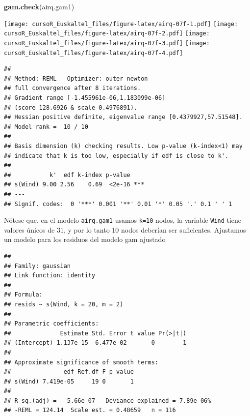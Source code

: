 \documentclass[]{book}
\newenvironment{Shaded}{\begin{snugshade}}{\end{snugshade}}
\newcommand{\KeywordTok}[1]{\textcolor[rgb]{0.13,0.29,0.53}{\textbf{#1}}}
\newcommand{\DataTypeTok}[1]{\textcolor[rgb]{0.13,0.29,0.53}{#1}}
\newcommand{\DecValTok}[1]{\textcolor[rgb]{0.00,0.00,0.81}{#1}}
\newcommand{\StringTok}[1]{\textcolor[rgb]{0.31,0.60,0.02}{#1}}
\newcommand{\OtherTok}[1]{\textcolor[rgb]{0.56,0.35,0.01}{#1}}
\newcommand{\OperatorTok}[1]{\textcolor[rgb]{0.81,0.36,0.00}{\textbf{#1}}}
\newcommand{\NormalTok}[1]{#1}
\begin{document}
\begin{Shaded}
\begin{Highlighting}[]
\KeywordTok{gam.check}\NormalTok{(airq.gam1)}
\end{Highlighting}
\end{Shaded}

\texttt{[image: cursoR\_Euskaltel\_files/figure-latex/airq-07f-1.pdf]}
\texttt{[image: cursoR\_Euskaltel\_files/figure-latex/airq-07f-2.pdf]}
\texttt{[image: cursoR\_Euskaltel\_files/figure-latex/airq-07f-3.pdf]}
\texttt{[image: cursoR\_Euskaltel\_files/figure-latex/airq-07f-4.pdf]}

\begin{verbatim}
## 
## Method: REML   Optimizer: outer newton
## full convergence after 8 iterations.
## Gradient range [-1.455961e-06,1.183099e-06]
## (score 128.6926 & scale 0.4976891).
## Hessian positive definite, eigenvalue range [0.4379927,57.51548].
## Model rank =  10 / 10 
## 
## Basis dimension (k) checking results. Low p-value (k-index<1) may
## indicate that k is too low, especially if edf is close to k'.
## 
##           k'  edf k-index p-value    
## s(Wind) 9.00 2.56    0.69  <2e-16 ***
## ---
## Signif. codes:  0 '***' 0.001 '**' 0.01 '*' 0.05 '.' 0.1 ' ' 1
\end{verbatim}

Nótese que, en el modelo \texttt{airq.gam1} usamos \texttt{k=10} nodos,
la variable \texttt{Wind} tiene valores únicos de \(31\), y por lo tanto
10 nodos deberían ser suficientes. Ajustamos un modelo para los residuos
del modelo gam ajustado

\begin{Shaded}
\end{Shaded}

\begin{verbatim}
## 
## Family: gaussian 
## Link function: identity 
## 
## Formula:
## resids ~ s(Wind, k = 20, m = 2)
## 
## Parametric coefficients:
##              Estimate Std. Error t value Pr(>|t|)
## (Intercept) 1.137e-15  6.477e-02       0        1
## 
## Approximate significance of smooth terms:
##               edf Ref.df F p-value
## s(Wind) 7.419e-05     19 0       1
## 
## R-sq.(adj) =  -5.66e-07   Deviance explained = 7.89e-06%
## -REML = 124.14  Scale est. = 0.48659   n = 116
\end{verbatim}
\end{document}
